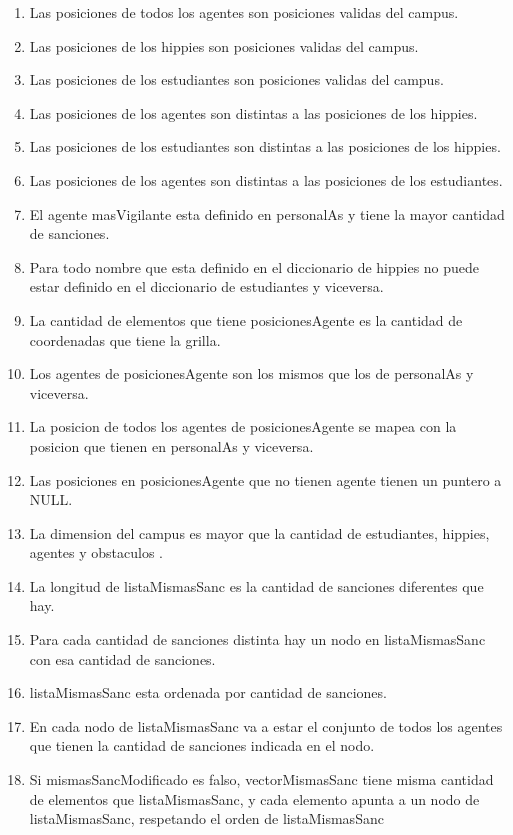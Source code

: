 \begin{enumerate}
	\item Las posiciones de todos los agentes son posiciones validas del campus.
	\item Las posiciones de los hippies son posiciones validas del campus.
	\item Las posiciones de los estudiantes son posiciones validas del campus.
	\item Las posiciones de los agentes son distintas a las posiciones de los hippies.
	\item Las posiciones de los estudiantes son distintas a las posiciones de los hippies.
	\item Las posiciones de los agentes son distintas a las posiciones de los estudiantes.
	\item El agente masVigilante esta definido en personalAs y tiene la mayor cantidad de sanciones.
	\item Para todo nombre que esta definido en el diccionario de hippies no puede estar definido en el diccionario de estudiantes y viceversa.
	\item La cantidad de elementos que tiene posicionesAgente es la cantidad de coordenadas que tiene la grilla.
	\item Los agentes de posicionesAgente son los mismos que los de personalAs y viceversa.
	\item La posicion de todos los agentes de posicionesAgente se mapea con la posicion que tienen en personalAs y viceversa.
	\item Las posiciones en posicionesAgente que no tienen agente tienen un puntero a NULL.
	\item La dimension del campus es mayor que la cantidad de estudiantes, hippies, agentes y obstaculos .
	\item La longitud de listaMismasSanc es la cantidad de sanciones diferentes que hay.
	\item Para cada cantidad de sanciones distinta hay un nodo en listaMismasSanc con esa cantidad de sanciones.
	\item listaMismasSanc esta ordenada por cantidad de sanciones.
	\item En cada nodo de listaMismasSanc va a estar el conjunto de todos los agentes que tienen la cantidad de sanciones indicada en el nodo.
	\item Si mismasSancModificado es falso, vectorMismasSanc tiene misma cantidad de elementos que listaMismasSanc, y cada elemento apunta a un nodo de listaMismasSanc, respetando el orden de listaMismasSanc


\end{enumerate}
